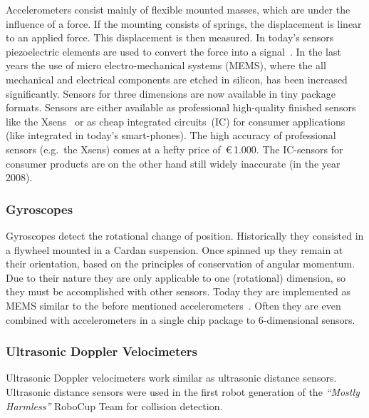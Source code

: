 \documentclass[12pt,a4paper]{article}
\newcommand{\MH}{\emph{``Mostly Harmless''} RoboCup Team\xspace}
\begin{document}
Accelerometers consist mainly of flexible mounted masses, which are under the influence of a force.
If the mounting consists of springs, the displacement is linear to an applied force.
This displacement is then measured.
In today's sensors piezoelectric elements are used to convert the force into a signal~\cite{emt}.
In the last years the use of micro electro-mechanical systems (MEMS), where the all mechanical and electrical components are etched in silicon, has been increased significantly.
Sensors for three dimensions are now available in tiny package formats.
Sensors are either available as professional high-quality finished sensors like the Xsens~\cite{xsens} or as cheap integrated circuits~(IC) for consumer applications (like integrated in today's smart-phones).
The high accuracy of professional sensors (e.g.\ the Xsens) comes at a hefty price of~\euro\,1.000.
The IC-sensors for consumer products are on the other hand still widely inaccurate (in the year 2008).


\subsubsection{Gyroscopes}

Gyroscopes detect the rotational change of position.
Historically they consisted in a flywheel mounted in a Cardan suspension.
Once spinned up they remain at their orientation, based on the principles of conservation of angular momentum.\\
Due to their nature they are only applicable to one (rotational) dimension, so they must be accomplished with other sensors.
Today they are implemented as MEMS similar to  the before mentioned accelerometers~\cite{pmt}.
Often they are even combined with accelerometers in a single chip package to 6-dimensional sensors.


\subsubsection{Ultrasonic Doppler Velocimeters}

Ultrasonic Doppler velocimeters work similar as ultrasonic distance sensors.
Ultrasonic distance sensors were used in the first robot generation of the \MH for collision detection.
\end{document}
